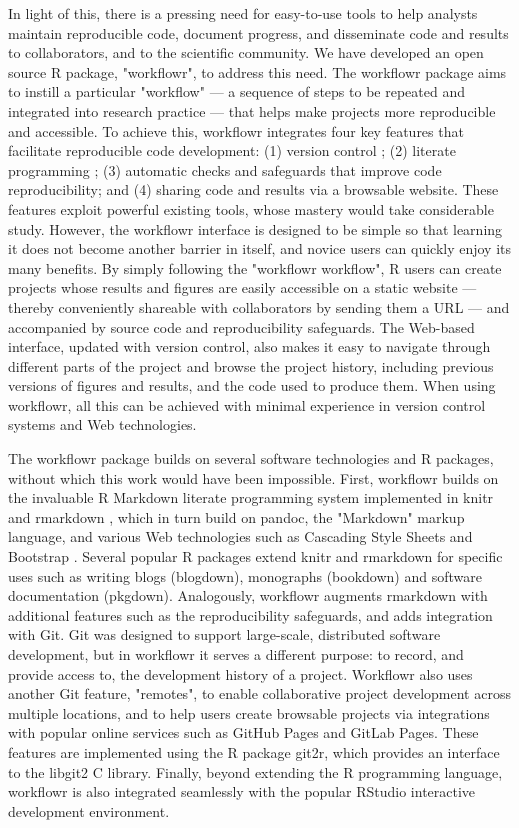 \documentclass[9pt,a4paper]{extarticle}
\begin{document}
In light of this, there is a pressing need for easy-to-use tools to help
analysts maintain reproducible code, document progress, and disseminate
code and results to collaborators, and to the scientific community. We
have developed an open source R \cite{R2019} package, "workflowr", to
address this need. The workflowr package aims to instill a particular
"workflow" --- a sequence of steps to be repeated and integrated into
research practice --- that helps make projects more reproducible and
accessible. To achieve this, workflowr integrates four key features that
facilitate reproducible code development: (1) version control
\cite{Loeliger2012, Chacon2014}; (2) literate programming
\cite{Xie2018}; (3) automatic checks and safeguards that improve code
reproducibility; and (4) sharing code and results via a browsable
website. These features exploit powerful existing tools, whose mastery
would take considerable study. However, the workflowr interface is
designed to be simple so that learning it does not become another
barrier in itself, and novice users can quickly enjoy its many benefits.
By simply following the "workflowr workflow", R users can create
projects whose results and figures are easily accessible on a static
website --- thereby conveniently shareable with collaborators by sending
them a URL --- and accompanied by source code and reproducibility
safeguards. The Web-based interface, updated with version control, also
makes it easy to navigate through different parts of the project and
browse the project history, including previous versions of figures and
results, and the code used to produce them. When using workflowr, all
this can be achieved with minimal experience in version control systems
and Web technologies.

The workflowr package builds on several software technologies and R
packages, without which this work would have been impossible. First,
workflowr builds on the invaluable R Markdown literate programming
system implemented in knitr \cite{Xie2014, knitr} and rmarkdown
\cite{Xie2018, rmarkdown}, which in turn build on pandoc, the "Markdown"
markup language, and various Web technologies such as Cascading Style
Sheets and Bootstrap \cite{Spurlock2013}. Several popular R packages
extend knitr and rmarkdown for specific uses such as writing blogs
(blogdown), monographs (bookdown) and software documentation (pkgdown).
Analogously, workflowr augments rmarkdown with additional features such
as the reproducibility safeguards, and adds integration with Git. Git
was designed to support large-scale, distributed software development,
but in workflowr it serves a different purpose: to record, and provide
access to, the development history of a project. Workflowr also uses
another Git feature, "remotes", to enable collaborative project
development across multiple locations, and to help users create
browsable projects via integrations with popular online services such as
GitHub Pages and GitLab Pages. These features are implemented using the
R package git2r, which provides an interface to the libgit2 C library.
Finally, beyond extending the R programming language, workflowr is also
integrated seamlessly with the popular RStudio interactive development
environment.
\end{document}
